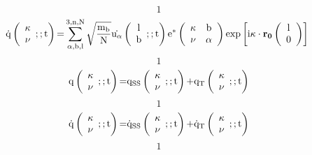 \documentclass{article}
\begin{document}
\[1\] 
\[\dot{{\rm q}}\left( \begin{array}{c}
{\mathbf \kappa } \\ 
\nu  \end{array}
;;{\rm t}\right){\rm =}\sum^{{\rm 3,n,N}}_{\alpha {\rm ,b,l}}{\sqrt{\frac{{{\rm m}}_{{\rm b}}}{{\rm N}}}}\dot{{{\rm u}}_{\alpha }}\left( \begin{array}{c}
{\rm l} \\ 
{\rm b} \end{array}
;;{\rm t}\right){{\rm e}}^{{\rm *}}\left( \begin{array}{cc}
{\mathbf \kappa } & {\rm b} \\ 
\nu  & \alpha  \end{array}
\right){\exp  \left[{\rm i}{\mathbf \kappa }\cdot {{\mathbf r}}_{{\mathbf 0}}\left( \begin{array}{c}
{\rm l} \\ 
0 \end{array}
\right)\right]\ }\] 
\[1\] 
\[{\rm q}\left( \begin{array}{c}
{\mathbf \kappa } \\ 
\nu  \end{array}
;;{\rm t}\right){\rm =}{{\rm q}}_{{\rm SS}}\left( \begin{array}{c}
{\mathbf \kappa } \\ 
\nu  \end{array}
;;{\rm t}\right){\rm +}{{\rm q}}_{{\rm T}}\left( \begin{array}{c}
{\mathbf \kappa } \\ 
\nu  \end{array}
;;{\rm t}\right)\] 
\[1\] 
\[\dot{{\rm q}}\left( \begin{array}{c}
{\mathbf \kappa } \\ 
\nu  \end{array}
;;{\rm t}\right){\rm =}{\dot{{\rm q}}}_{{\rm SS}}\left( \begin{array}{c}
{\mathbf \kappa } \\ 
\nu  \end{array}
;;{\rm t}\right){\rm +}{\dot{{\rm q}}}_{{\rm T}}\left( \begin{array}{c}
{\mathbf \kappa } \\ 
\nu  \end{array}
;;{\rm t}\right)\] 
\[1\] 
\end{document}
